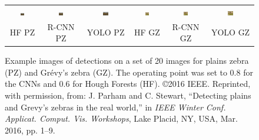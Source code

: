 \begin{figure}[!t]
\begin{center}
\begin{tabular}{cccccc}
            \includegraphics[width=0.13\textwidth]{resources/detections-rf-pz9.pdf}   &
            \includegraphics[width=0.13\textwidth]{resources/detections-rcnn-pz9.pdf} &
            \includegraphics[width=0.13\textwidth]{resources/detections-yolo-pz9.pdf} &
            \includegraphics[width=0.13\textwidth]{resources/detections-rf-gz9.pdf}   &
            \includegraphics[width=0.13\textwidth]{resources/detections-rcnn-gz9.pdf} &
            \includegraphics[width=0.13\textwidth]{resources/detections-yolo-gz9.pdf}   \\

            HF PZ                                                                     &
            R-CNN PZ                                                                  &
            YOLO PZ                                                                   &
            HF GZ                                                                     &
            R-CNN GZ                                                                  &
            YOLO GZ
        \end{tabular}
        \caption{Example images of detections on a set of 20 images for plains zebra (PZ) and Gr\'evy's zebra (GZ).  The operating point was set to 0.8 for the CNNs and 0.6 for Hough Forests (HF).  \copyright 2016 IEEE. Reprinted, with permission, from: J. Parham and C. Stewart, ``Detecting plains and Grevy’s zebras in the real world,'' in \textit{IEEE Winter Conf. Applicat. Comput. Vis. Workshops}, Lake Placid, NY, USA, Mar. 2016, pp. 1–9.}
        \label{fig:detections}
    \end{center}
\end{figure}

